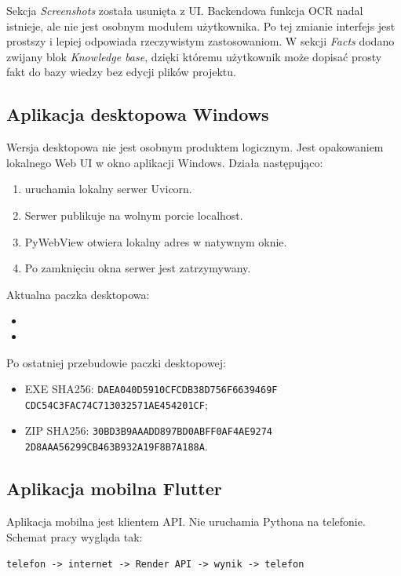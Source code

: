 \documentclass[12pt,a4paper]{article}
\begin{document}
Sekcja \textit{Screenshots} została usunięta z UI.
Backendowa funkcja OCR nadal istnieje, ale nie jest osobnym modułem użytkownika.
Po tej zmianie interfejs jest prostszy i lepiej odpowiada rzeczywistym zastosowaniom.
W sekcji \textit{Facts} dodano zwijany blok \textit{Knowledge base}, dzięki któremu użytkownik może dopisać prosty fakt do bazy wiedzy bez edycji plików projektu.

\subsection{Aplikacja desktopowa Windows}
Wersja desktopowa nie jest osobnym produktem logicznym.
Jest opakowaniem lokalnego Web UI w okno aplikacji Windows.
Działa następująco:
\begin{enumerate}
  \item {} uruchamia lokalny serwer Uvicorn.
  \item Serwer publikuje  na wolnym porcie localhost.
  \item PyWebView otwiera lokalny adres w natywnym oknie.
  \item Po zamknięciu okna serwer jest zatrzymywany.
\end{enumerate}

Aktualna paczka desktopowa:
\begin{itemize}
  \item {}
  \item {}
\end{itemize}

Po ostatniej przebudowie paczki desktopowej:
\begin{itemize}
  \item EXE SHA256: \texttt{DAEA040D5910CFCDB38D756F6639469F}\\
  \texttt{CDC54C3FAC74C713032571AE454201CF};
  \item ZIP SHA256: \texttt{30BD3B9AAADD897BD0ABFF0AF4AE9274}\\
  \texttt{2D8AAA56299CB463B932A19F8B7A188A}.
\end{itemize}

\subsection{Aplikacja mobilna Flutter}
Aplikacja mobilna jest klientem API.
Nie uruchamia Pythona na telefonie.
Schemat pracy wygląda tak:
\begin{center}
\texttt{telefon -> internet -> Render API -> wynik -> telefon}
\end{center}
\end{document}
